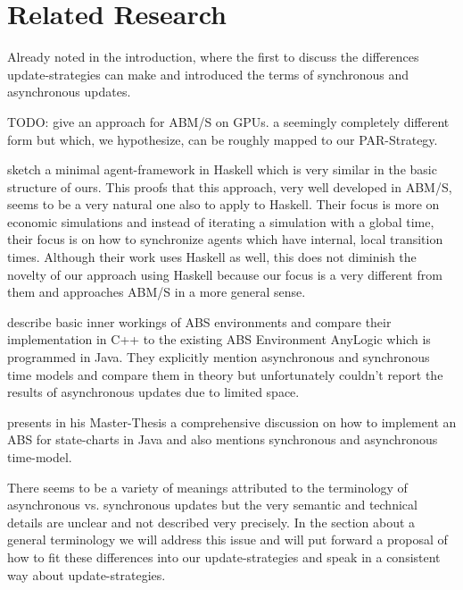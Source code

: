 \section{Related Research}
Already noted in the introduction, \cite{huberman_evolutionary_1993} where the first to discuss the differences update-strategies can make and introduced the terms of synchronous and asynchronous updates.

\medskip

TODO: \cite{a_framework_2008} give an approach for ABM/S on GPUs. a seemingly completely different form but which, we hypothesize, can be roughly mapped to our PAR-Strategy. 
	
\medskip
	
\cite{botta_time_2010} sketch a minimal agent-framework in Haskell which is very similar in the basic structure of ours. This proofs that this approach, very well developed in ABM/S, seems to be a very natural one also to apply to Haskell. Their focus is more on economic simulations and instead of iterating a simulation with a global time, their focus is on how to synchronize agents which have internal, local transition times. Although their work uses Haskell as well, this does not diminish the novelty of our approach using Haskell because our focus is a very different from them and approaches ABM/S in a more general sense.

\medskip

\cite{dawson_opening_2014} describe basic inner workings of ABS environments and compare their implementation in C++ to the existing ABS Environment AnyLogic which is programmed in Java. They explicitly mention asynchronous and synchronous time models and compare them in theory but unfortunately couldn't report the results of asynchronous updates due to limited space.

\medskip

\cite{yuxuan_agent-based_2016} presents in his Master-Thesis a comprehensive discussion on how to implement an ABS for state-charts in Java and also mentions synchronous and asynchronous time-model.

\medskip

There seems to be a variety of meanings attributed to the terminology of asynchronous vs. synchronous updates but the very semantic and technical details are unclear and not described very precisely. In the section about a general terminology we will address this issue and will put forward a proposal of how to fit these differences into our update-strategies and speak in a consistent way about update-strategies.